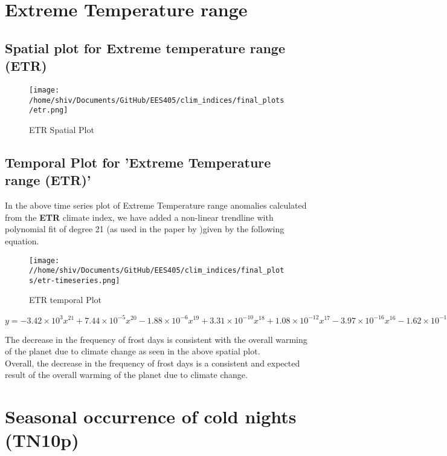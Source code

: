\documentclass[a4paper, 12pt, twoside]{report}
\begin{document}
\section{Extreme Temperature range}
\subsection{Spatial plot for Extreme temperature range (ETR)}
\begin{figure}[htb]
    \centering
    \texttt{[image: /home/shiv/Documents/GitHub/EES405/clim\_indices/final\_plots/etr.png]}
    \caption{ETR Spatial Plot}
    \label{fig:etr_spatial}
\end{figure}

\subsection{Temporal Plot for 'Extreme Temperature range (ETR)'}
In the above time series plot of Extreme Temperature range anomalies calculated from the \textbf{ETR} climate index, we have added a non-linear trendline with polynomial fit of degree 21 (as used in the paper by )given by the following equation. \\
\begin{figure}[htb]
    \centering
    \texttt{[image: //home/shiv/Documents/GitHub/EES405/clim\_indices/final\_plots/etr-timeseries.png]}
    \caption{ETR temporal Plot}
    \label{fig:etr_temporal}
\end{figure}

$ y = -3.42\times10^{3}x^{21}+7.44\times10^{-5}x^{20}-1.88\times10^{-6}x^{19}+3.31\times10^{-10}x^{18}+1.08\times10^{-12}x^{17}-3.97\times10^{-16}x^{16}-1.62\times10^{-19}x^{15}+1.05\times10^{-22}x^{14}-5.80\times10^{-27}x^{13}-8.00\times10^{-30}x^{12}+2.29\times10^{-33}x^{11}-1.20\times10^{-37}x^{10}-6.72\times10^{-41}x^{9}+1.99\times10^{-44}x^{8}-2.95\times10^{-48}x^{7}+2.85\times10^{-52}x^{6}-1.92\times10^{-56}x^{5}+9.12\times10^{-61}x^{4}-3.03\times10^{-65}x^{3}+6.69\times10^{-70}x^{2}-8.87\times10^{-75}x+5.34\times10^{-80}$

The decrease in the frequency of frost days is consistent with the overall warming of the planet due to climate change as seen in the above spatial plot.\\
Overall, the decrease in the frequency of frost days is a consistent and expected result of the overall warming of the planet due to climate change.

\section{Seasonal occurrence of cold nights (TN10p)}
\end{document}
